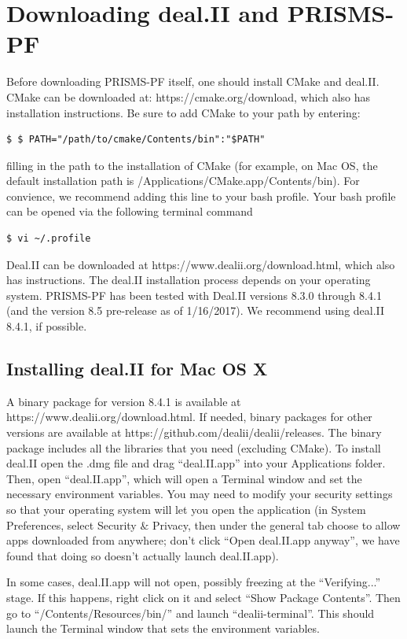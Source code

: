 \documentclass[10pt]{article} %
\begin{document}
\section{Downloading deal.II and PRISMS-PF}

Before downloading PRISMS-PF itself, one should install CMake and deal.II. CMake can be downloaded at: https://cmake.org/download, which also has installation instructions. Be sure to add CMake to your path by entering:
\begin{lstlisting}
$ $ PATH="/path/to/cmake/Contents/bin":"$PATH"
\end{lstlisting}
filling in the path to the installation of CMake (for example, on Mac OS, the default installation path is /Applications/CMake.app/Contents/bin). For convience, we recommend adding this line to your bash profile. Your bash profile can be opened via the following terminal command
\begin{lstlisting}
$ vi ~/.profile
\end{lstlisting}

Deal.II can be downloaded at https://www.dealii.org/download.html, which also has instructions. The deal.II installation process depends on your operating system. PRISMS-PF has been tested with Deal.II versions 8.3.0 through 8.4.1 (and the version 8.5 pre-release as of 1/16/2017). We recommend using deal.II 8.4.1, if possible.

\subsection{Installing deal.II for Mac OS X}
A binary package for version 8.4.1 is available at https://www.dealii.org/download.html. If needed, binary packages for other versions are available at https://github.com/dealii/dealii/releases. The binary package includes all the libraries that you need (excluding CMake). To install deal.II open the .dmg file and drag ``deal.II.app'' into your Applications folder. Then, open ``deal.II.app'', which will open a Terminal window and set the necessary environment variables. You may need to modify your security settings so that your operating system will let you open the application (in System Preferences, select Security $\&$ Privacy, then under the general tab choose to allow apps downloaded from anywhere; don't click ``Open deal.II.app anyway'', we have found that doing so doesn't actually launch deal.II.app). 

In some cases, deal.II.app will not open, possibly freezing at the ``Verifying...'' stage. If this happens, right click on it and select ``Show Package Contents''. Then go to ``/Contents/Resources/bin/'' and launch ``dealii-terminal''. This should launch the Terminal window that sets the environment variables.
\end{document}
